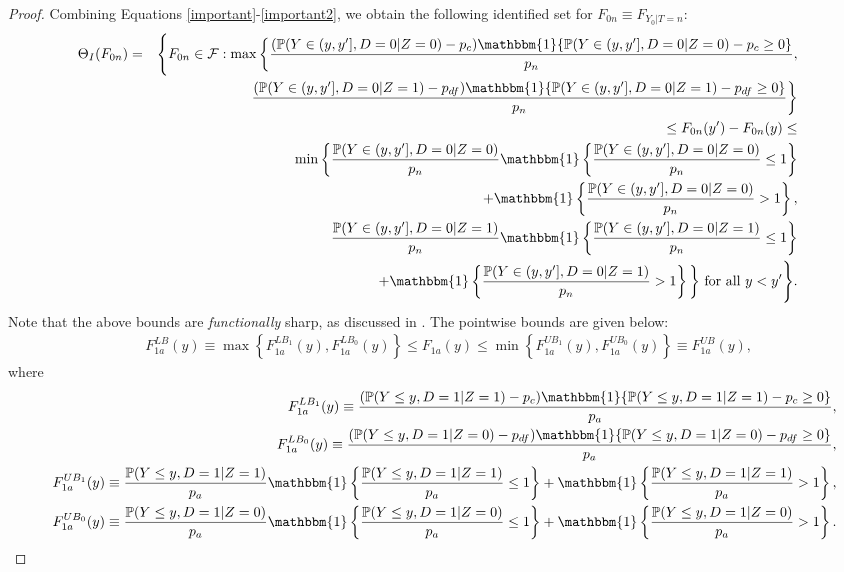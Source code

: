 \documentclass[12pt]{article}
\theoremstyle{plain}
\theoremstyle{definition}
\theoremstyle{remark}
\begin{document}
\begin{proof}
Combining Equations \eqref{important}-\eqref{important2}, we obtain the following identified set for $F_{0n}\equiv F_{Y_0\vert T=n}$:
\begin{eqnarray}
    \Theta_I(F_{0n})&=&\Bigg\{
    F_{0n} \in \mathcal F: \max\bigg\{ \frac{(\mathbb P(Y\in (y,y'], D=0 \vert Z=0)- p_c)\mathbbm{1}\{\mathbb P(Y\in (y,y'], D=0 \vert Z=0)- p_c\geq 0\}}{p_n},\nonumber\\
   && \qquad \frac{(\mathbb P(Y\in (y,y'], D=0 \vert Z=1)- p_{df})\mathbbm{1}\{\mathbb P(Y\in (y,y'], D=0 \vert Z=1)- p_{df}\geq 0\}}{p_n}\bigg\}\nonumber \\
   && \qquad \leq F_{0n}(y')-F_{0n}(y) \leq \\
   && \min\bigg\{ \frac{\mathbb P(Y\in (y,y'], D=0 \vert Z=0)}{p_n}\mathbbm{1}\left\{\frac{\mathbb P(Y\in (y,y'], D=0 \vert Z=0)}{p_n} \leq 1\right\}\nonumber \\
   && \qquad \qquad +\mathbbm{1}\left\{\frac{\mathbb P(Y\in (y,y'], D=0 \vert Z=0)}{p_n} > 1\right\},\nonumber\\
   && \qquad \frac{\mathbb P(Y\in (y,y'], D=0 \vert Z=1)}{p_n}\mathbbm{1}\left\{\frac{\mathbb P(Y\in (y,y'], D=0 \vert Z=1)}{p_n} \leq 1\right\}\nonumber \\
   && \qquad \qquad +\mathbbm{1}\left\{\frac{\mathbb P(Y\in (y,y'], D=0 \vert Z=1)}{p_n} > 1\right\} \bigg\} \text{ for all } y<y'    
   \Bigg\}.\nonumber
    \end{eqnarray}
Note that the above bounds are \textit{functionally} sharp, as discussed in \cite{mourifie2020sharp}. %
The pointwise bounds are given below:
\begin{eqnarray}
   &&F_{1a}^{LB}(y)\equiv \max\left\{F_{1a}^{LB_1}(y),F_{1a}^{LB_0}(y)\right\} \leq F_{1a}(y) \leq \min\left\{F_{1a}^{UB_1}(y),F_{1a}^{UB_0}(y)\right\}\equiv F_{1a}^{UB}(y),
\end{eqnarray}
where
\begin{eqnarray*}
   &&F_{1a}^{LB_1}(y)\equiv \frac{(\mathbb P(Y\leq y, D=1 \vert Z=1)- p_c)\mathbbm{1}\{\mathbb P(Y\leq y, D=1 \vert Z=1)- p_c\geq 0\}}{p_a},\\
   &&F_{1a}^{LB_0}(y)\equiv \frac{(\mathbb P(Y\leq y, D=1 \vert Z=0)- p_{df})\mathbbm{1}\{\mathbb P(Y\leq y, D=1 \vert Z=0)- p_{df}\geq 0\}}{p_a}, \\
   &&F_{1a}^{UB_1}(y)\equiv \frac{\mathbb P(Y\leq y, D=1 \vert Z=1)}{p_a}\mathbbm{1}\left\{\frac{\mathbb P(Y\leq y, D=1 \vert Z=1)}{p_a} \leq 1\right\}+\mathbbm{1}\left\{\frac{\mathbb P(Y\leq y, D=1 \vert Z=1)}{p_a} > 1\right\},\\
   && F_{1a}^{UB_0}(y) \equiv \frac{\mathbb P(Y\leq y, D=1 \vert Z=0)}{p_a}\mathbbm{1}\left\{\frac{\mathbb P(Y\leq y, D=1 \vert Z=0)}{p_a} \leq 1\right\} + \mathbbm{1}\left\{\frac{\mathbb P(Y\leq y, D=1 \vert Z=0)}{p_a} > 1\right\}.
    \end{eqnarray*}
    

\end{proof}
\end{document}
